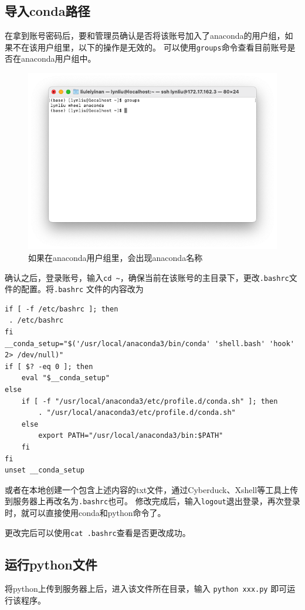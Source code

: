 \documentclass{article}
\begin{document}
\subsection{导入conda路径}
在拿到账号密码后，要和管理员确认是否将该账号加入了anaconda的用户组，如果不在该用户组里，以下的操作是无效的。
可以使用\verb|groups|命令查看目前账号是否在anaconda用户组中。
\begin{figure}[H]
    \centering
    \includegraphics[scale = 0.5]{figs/5.png}
    \caption{如果在anaconda用户组里，会出现anaconda名称}
\end{figure}
确认之后，登录账号，输入\verb|cd ~|，确保当前在该账号的主目录下，更改\verb|.bashrc|文件的配置。将\verb|.bashrc|
文件的内容改为
\begin{verbatim}
if [ -f /etc/bashrc ]; then
 . /etc/bashrc
fi
__conda_setup="$('/usr/local/anaconda3/bin/conda' 'shell.bash' 'hook' 2> /dev/null)"
if [ $? -eq 0 ]; then
    eval "$__conda_setup"
else
    if [ -f "/usr/local/anaconda3/etc/profile.d/conda.sh" ]; then
        . "/usr/local/anaconda3/etc/profile.d/conda.sh"
    else
        export PATH="/usr/local/anaconda3/bin:$PATH"
    fi
fi
unset __conda_setup
\end{verbatim}
或者在本地创建一个包含上述内容的txt文件，通过Cyberduck、Xshell等工具上传到服务器上再改名为\verb|.bashrc|也可。
修改完成后，输入\verb|logout|退出登录，再次登录时，就可以直接使用conda和python命令了。

更改完后可以使用\verb|cat .bashrc|查看是否更改成功。
\subsection{运行python文件}
将python上传到服务器上后，进入该文件所在目录，输入
\verb|python xxx.py|
即可运行该程序。
\end{document}
